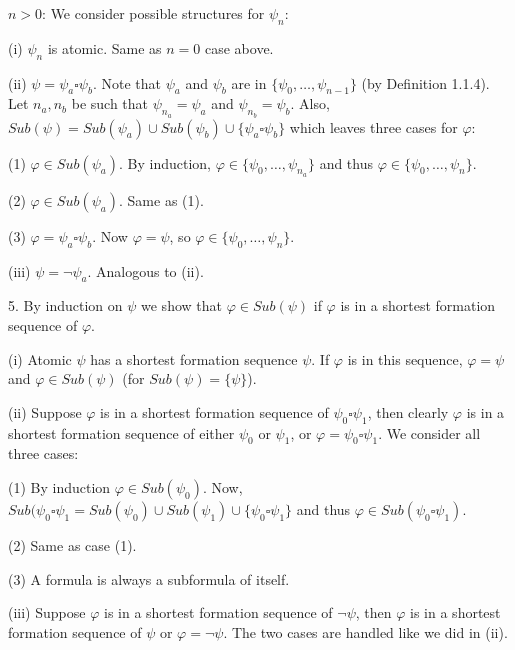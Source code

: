 \documentclass[a4paper,11pt]{article}
\begin{document}
\begin{description}
\begin{description}
\item{$n > 0$:} We consider possible structures for $\psi_{n}$:
  \begin{description}
    \item{(i)} $\psi_{n}$ is atomic. Same as $n = 0$ case above.
    \item{(ii)} $\psi = \psi_{a} \square \psi_{b}$. Note that $\psi_{a}$ and
      $\psi_{b}$ are in $\{\psi_{0}, \ldots, \psi_{n-1}\}$ (by Definition 1.1.4).
      Let $n_{a}, n_{b}$ be such that $\psi_{n_{a}} = \psi_{a}$ and
      $\psi_{n_{b}} = \psi_{b}$. Also,
      $Sub(\psi) = Sub(\psi_{a}) \cup Sub(\psi_{b}) \cup \{\psi_{a} \square \psi_{b}\}$
      which leaves three cases for $\varphi$:
        \begin{description}
          \item{(1)} $\varphi \in Sub(\psi_{a})$. By induction,
            $\varphi \in \{\psi_{0}, \ldots, \psi_{n_{a}}\}$ and thus
            $\varphi \in \{\psi_{0}, \ldots, \psi_{n}\}$.
          \item{(2)} $\varphi \in Sub(\psi_{a})$. Same as (1).
          \item{(3)} $\varphi = \psi_{a} \square \psi_{b}$. Now $\varphi = \psi$,
            so $\varphi \in \{\psi_{0}, \ldots, \psi_{n}\}$.
        \end{description}
    \item{(iii)} $\psi = \neg \psi_{a}$. Analogous to (ii).
  \end{description}
\end{description}

\item{5.} By induction on $\psi$ we show that $\varphi \in Sub(\psi)$ if $\varphi$ is in a shortest
  formation sequence of $\varphi$.
\begin{description}
\item{(i)} Atomic $\psi$ has a shortest formation sequence $\psi$. If $\varphi$ is
  in this sequence, $\varphi = \psi$ and $\varphi \in Sub(\psi)$ (for
  $Sub(\psi) = \{\psi\}$).
\item{(ii)} Suppose $\varphi$ is in a shortest formation sequence of $\psi_{0} \square \psi_{1}$, then
  clearly $\varphi$ is in a shortest formation sequence of either $\psi_{0}$ or $\psi_{1}$, or
  $\varphi = \psi_{0} \square \psi_{1}$. We consider all three cases:
  \begin{description}
    \item{(1)} By induction $\varphi \in Sub(\psi_{0})$. Now,
      $Sub(\psi_{0} \square \psi_{1} = Sub(\psi_{0}) \cup Sub(\psi_{1}) \cup \{\psi_{0} \square \psi_{1}\}$
      and thus $\varphi \in Sub(\psi_{0} \square \psi_{1})$.
    \item{(2)} Same as case (1).
    \item{(3)} A formula is always a subformula of itself.
  \end{description}
\item{(iii)} Suppose $\varphi$ is in a shortest formation sequence of $\neg \psi$, then $\varphi$ is in
  a shortest formation sequence of $\psi$ or $\varphi = \neg \psi$. The two cases are handled like we did
  in (ii).
\end{description}


\end{description}
\end{document}
